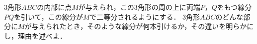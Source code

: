 \documentclass[../../main.tex]{subfiles}
\begin{document}
3角形$ABC$の内部に点$M$が与えられ，この3角形の周の上に両端$P$，$Q$をもつ線分$PQ$を引いて，この線分が$M$で二等分されるようにする．
3角形$ABC$のどんな部分に$M$が与えられたとき，そのような線分が何本引けるか，その違いを明らかにし，理由を述べよ．
\end{document}
